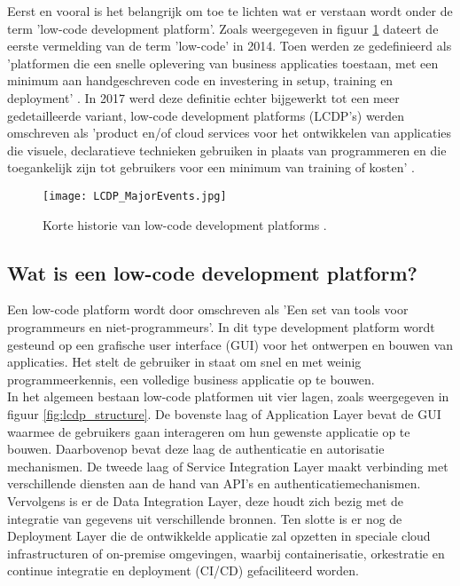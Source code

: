 Eerst en vooral is het belangrijk om toe te lichten wat er verstaan wordt onder de term 'low-code development platform'. Zoals weergegeven in figuur \ref{fig:lcdp_history} dateert de eerste vermelding van de term 'low-code' in 2014. Toen werden ze gedefinieerd als 'platformen die een snelle oplevering van business applicaties toestaan, met een minimum aan handgeschreven code en investering in setup, training en deployment' \autocite{Ruscio2022}. In 2017 werd deze definitie echter bijgewerkt tot een meer gedetailleerde variant, low-code development platforms (LCDP's) werden omschreven als 'product en/of cloud services voor het ontwikkelen van applicaties die visuele, declaratieve technieken gebruiken in plaats van programmeren en die toegankelijk zijn tot gebruikers voor een minimum van training of kosten' \autocite{Ruscio2022}. \\

\begin{figure}[hb]
    \centering
    \texttt{[image: LCDP\_MajorEvents.jpg]}
    \caption[Geschiedenis low-code development platforms]{Korte historie van low-code development platforms \autocite{Ruscio2022}.}
    \label{fig:lcdp_history}
\end{figure}

\subsection{Wat is een low-code development platform?}
\label{subsec:what_is_low_code}

Een low-code platform wordt door \textcite{Waszkowski2019} omschreven als 'Een set van tools voor programmeurs en niet-programmeurs'. In dit type development platform wordt gesteund op een grafische user interface (GUI) voor het ontwerpen en bouwen van applicaties. Het stelt de gebruiker in staat om snel en met weinig programmeerkennis, een volledige business applicatie op te bouwen. \\

In het algemeen bestaan low-code platformen uit vier lagen, zoals weergegeven in figuur \ref{fig:lcdp_structure}. De bovenste laag of Application Layer bevat de GUI waarmee de gebruikers gaan interageren om hun gewenste applicatie op te bouwen. Daarbovenop bevat deze laag de authenticatie en autorisatie mechanismen. De tweede laag of Service Integration Layer maakt verbinding met verschillende diensten aan de hand van API's en authenticatiemechanismen. Vervolgens is er de Data Integration Layer, deze houdt zich bezig met de integratie van gegevens uit verschillende bronnen. Ten slotte is er nog de Deployment Layer die de ontwikkelde applicatie zal opzetten in speciale cloud infrastructuren of on-premise omgevingen, waarbij containerisatie, orkestratie en continue integratie en deployment (CI/CD) gefaciliteerd worden. \\

